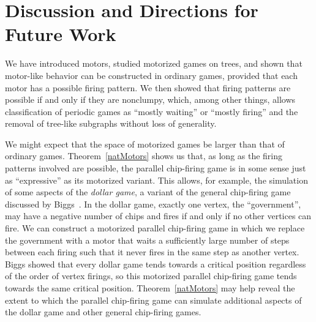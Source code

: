 \section{Discussion and Directions for Future Work} \label{discussion}

We have introduced motors, studied motorized games on trees, and shown that
motor-like behavior can be constructed in ordinary games, provided that each
motor has a possible firing pattern. We then showed that firing patterns are
possible if and only if they are nonclumpy, which, among other things, allows
classification of periodic games as ``mostly waiting'' or ``mostly firing'' and
the removal of tree-like subgraphs without loss of generality.

We might expect that the space of motorized games be larger than that of
ordinary games. Theorem~\ref{natMotors} shows us that, as long as the firing
patterns involved are possible, the parallel chip-firing game is in some sense
just as ``expressive'' as its motorized variant. This allows, for example, the
simulation of some aspects of the \emph{dollar game}, a variant of the general
chip-firing game discussed by Biggs~\cite{biggs}. In the dollar game, exactly
one vertex, the ``government'', may have a negative number of chips and fires
if and only if no other vertices can fire. We can construct a motorized
parallel chip-firing game in which we replace the government with a motor that
waits a sufficiently large number of steps between each firing such that it
never fires in the same step as another vertex. Biggs showed that every dollar
game tends towards a critical position regardless of the order of vertex
firings, so this motorized parallel chip-firing game tends towards the same
critical position. Theorem~\ref{natMotors} may help reveal the extent to which
the parallel chip-firing game can simulate additional aspects of the dollar
game and other general chip-firing games.


